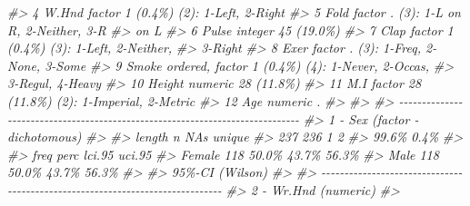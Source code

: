 \documentclass[
]{book}
\newenvironment{Shaded}{\begin{snugshade}}{\end{snugshade}}
\newcommand{\CommentTok}[1]{\textcolor[rgb]{0.56,0.35,0.01}{\textit{#1}}}
\begin{document}
\begin{Shaded}
\begin{Highlighting}[]
\CommentTok{\#\textgreater{}   4   W.Hnd    factor            1 (0.4\%)   (2): 1{-}Left, 2{-}Right         }
\CommentTok{\#\textgreater{}   5   Fold     factor            .          (3): 1{-}L on R, 2{-}Neither, 3{-}R}
\CommentTok{\#\textgreater{}                                             on L                         }
\CommentTok{\#\textgreater{}   6   Pulse    integer          45 (19.0\%)                               }
\CommentTok{\#\textgreater{}   7   Clap     factor            1 (0.4\%)   (3): 1{-}Left, 2{-}Neither,      }
\CommentTok{\#\textgreater{}                                             3{-}Right                      }
\CommentTok{\#\textgreater{}   8   Exer     factor            .          (3): 1{-}Freq, 2{-}None, 3{-}Some  }
\CommentTok{\#\textgreater{}   9   Smoke    ordered, factor   1 (0.4\%)   (4): 1{-}Never, 2{-}Occas,       }
\CommentTok{\#\textgreater{}                                             3{-}Regul, 4{-}Heavy             }
\CommentTok{\#\textgreater{}   10  Height   numeric          28 (11.8\%)                               }
\CommentTok{\#\textgreater{}   11  M.I      factor           28 (11.8\%)  (2): 1{-}Imperial, 2{-}Metric    }
\CommentTok{\#\textgreater{}   12  Age      numeric           .                                       }
\CommentTok{\#\textgreater{} }
\CommentTok{\#\textgreater{} }
\CommentTok{\#\textgreater{} {-}{-}{-}{-}{-}{-}{-}{-}{-}{-}{-}{-}{-}{-}{-}{-}{-}{-}{-}{-}{-}{-}{-}{-}{-}{-}{-}{-}{-}{-}{-}{-}{-}{-}{-}{-}{-}{-}{-}{-}{-}{-}{-}{-}{-}{-}{-}{-}{-}{-}{-}{-}{-}{-}{-}{-}{-}{-}{-}{-}{-}{-}{-}{-}{-}{-}{-}{-}{-}{-}{-}{-}{-}{-}{-}{-}{-}{-} }
\CommentTok{\#\textgreater{} 1 {-} Sex (factor {-} dichotomous)}
\CommentTok{\#\textgreater{} }
\CommentTok{\#\textgreater{}   length      n    NAs unique}
\CommentTok{\#\textgreater{}      237    236      1      2}
\CommentTok{\#\textgreater{}           99.6\%   0.4\%       }
\CommentTok{\#\textgreater{} }
\CommentTok{\#\textgreater{}         freq   perc  lci.95  uci.95\textquotesingle{}}
\CommentTok{\#\textgreater{} Female   118  50.0\%   43.7\%   56.3\%}
\CommentTok{\#\textgreater{} Male     118  50.0\%   43.7\%   56.3\%}
\CommentTok{\#\textgreater{} }
\CommentTok{\#\textgreater{} \textquotesingle{} 95\%{-}CI (Wilson)}
\CommentTok{\#\textgreater{} }
\CommentTok{\#\textgreater{} {-}{-}{-}{-}{-}{-}{-}{-}{-}{-}{-}{-}{-}{-}{-}{-}{-}{-}{-}{-}{-}{-}{-}{-}{-}{-}{-}{-}{-}{-}{-}{-}{-}{-}{-}{-}{-}{-}{-}{-}{-}{-}{-}{-}{-}{-}{-}{-}{-}{-}{-}{-}{-}{-}{-}{-}{-}{-}{-}{-}{-}{-}{-}{-}{-}{-}{-}{-}{-}{-}{-}{-}{-}{-}{-}{-}{-}{-} }
\CommentTok{\#\textgreater{} 2 {-} Wr.Hnd (numeric)}
\CommentTok{\#\textgreater{} }

\end{Highlighting}
\end{Shaded}
\end{document}
